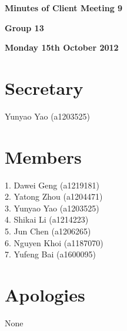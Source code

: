 \documentclass[11pt, a4paper]{article}
\begin{document}
 



\vspace*{15pt}

\begin{center}
\huge \bf Minutes of Client Meeting 9
\end{center}


\begin{center}
\Large \bf Group 13
\end{center}

\begin{center}
\Large \bf Monday 15th October 2012
\end{center}



\section*{Secretary}
Yunyao Yao (a1203525)

\section*{Members}
1. Dawei Geng (a1219181)\\
2. Yatong Zhou (a1204471)\\
3. Yunyao Yao (a1203525)\\
4. Shikai Li (a1214223)\\
5. Jun Chen (a1206265)\\
6. Nguyen Khoi (a1187070)\\
7. Yufeng Bai (a1600095)
\vspace*{10pt}

\section*{Apologies}
None

\end{document}
